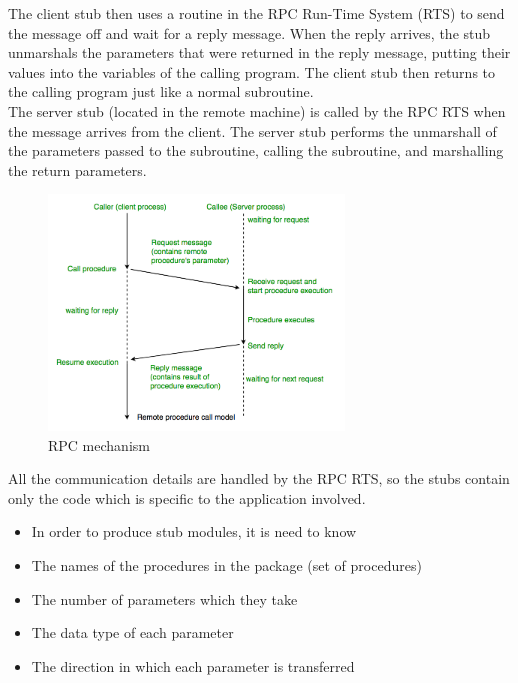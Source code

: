 \documentclass[a4paper, 12pt]{article} %
\begin{document}
                The client stub then uses a routine in the RPC Run-Time System (RTS) to send the message off and wait for a reply message. When the reply arrives, the stub unmarshals the parameters that were returned in the reply message, putting their values into the variables of the calling program. The client stub then returns to the calling program just like a normal subroutine.\\

                The server stub (located in the remote machine) is called by the RPC RTS when the message arrives from the client. The server stub performs the unmarshall of the parameters passed to the subroutine, calling the subroutine, and marshalling the return parameters. 
                \begin{figure}[h]
                    \centering
                    \includegraphics[width=0.7\textwidth]{rpc-mecha.png}
                    \caption{RPC mechanism}
                    \label{fig:rpc_mechanism}
                \end{figure}
                All the communication details are handled by the RPC RTS, so the stubs contain only the code which is specific to the application involved\cite{rpc2}.
                \begin{itemize}
                    \item In order to produce stub modules, it is need to know
                    \item The names of the procedures in the package (set of procedures)
                    \item The number of parameters which they take
                    \item The data type of each parameter
                    \item The direction in which each parameter is transferred
                \end{itemize}
\end{document}
